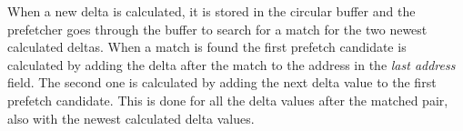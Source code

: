 When a new delta is calculated, it is stored in the circular buffer and the prefetcher goes through
the buffer to search for a match for the two newest calculated deltas. When a match is found the
first prefetch candidate is calculated by adding the delta after the match to the address in the
\emph{last address} field. The second one is calculated by adding the next delta value to the first
prefetch candidate. This is done for all the delta values after the matched pair, also with the
newest calculated delta values.
